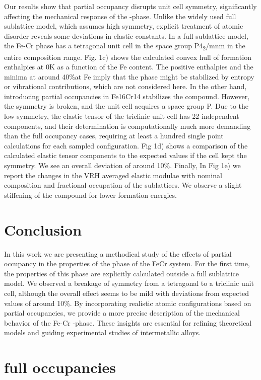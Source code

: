 \documentclass[superscriptaddress, 12pt]{revtex4-2}%
\begin{document}
Our results show that partial occupancy disrupts unit cell symmetry, significantly affecting the mechanical response of the \textsigma-phase. Unlike the widely used full sublattice model, which assumes high symmetry, explicit treatment of atomic disorder reveals some deviations in elastic constants. 
In a full sublattice model, the Fe-Cr \textsigma phase has a tetragonal unit cell in the space group P4\textsubscript{2}/mnm in the entire composition range. Fig. 1c) shows the calculated convex hull of formation enthalpies at 0K as a function of the Fe content. The positive enthalpies and the minima at around 40\%at Fe imply that the \textsigma phase might be stabilized by entropy or vibrational contributions, which are not considered here. In the other hand, introducing partial occupancies in Fe16Cr14 stabilizes the compound. However, the symmetry is broken, and the unit cell acquires a space group P.
Due to the low symmetry, the elastic tensor of the triclinic unit cell has 22 independent components, and their determination is computationally much more demanding than the full occupancy cases, requiring at least a hundred single point calculations for each sampled configuration. Fig 1d) shows a comparison of the calculated elastic tensor components to the expected values if the cell kept the symmetry. We see an overall deviation of around 10\%. 
Finally,  In Fig 1e) we report the changes in the VRH averaged elastic modulae with nominal composition and fractional occupation of the sublattices. We observe a slight stiffening of the compound for lower formation energies. 

\section{Conclusion}
In this work we are presenting a methodical study of the effects of partial occupancy in the properties of the \textsigma phase of the FeCr system. For the first time, the properties of this phase are explicitly calculated outside a full sublattice model. We observed a breakage of symmetry from a tetragonal to a triclinic unit cell, although the overall effect seems to be mild with deviations from expected values of around 10\%. By incorporating realistic atomic configurations based on partial occupancies, we provide a more precise description of the mechanical behavior of the Fe-Cr \textsigma-phase. These insights are essential for refining theoretical models and guiding experimental studies of intermetallic alloys.


\section{full occupancies}
\end{document}
